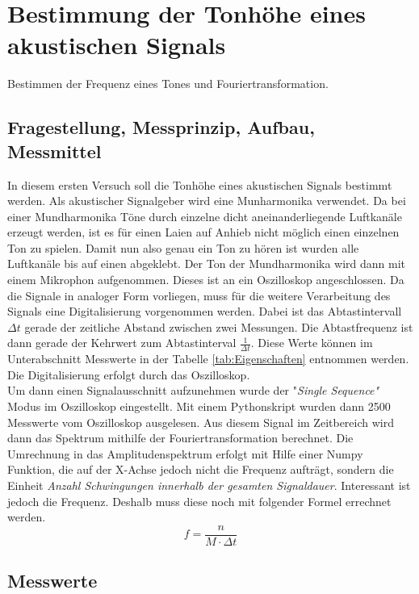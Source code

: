 %
%
\chapter{Bestimmung der Tonhöhe eines akustischen Signals}
\label{chap:VERSUCH_1}
Bestimmen der Frequenz eines Tones und Fouriertransformation.
 
\section{Fragestellung, Messprinzip, Aufbau, Messmittel}
\label{chap:VERSUCH_1_FRAGESTELLUNG}
In diesem ersten Versuch soll die Tonhöhe eines akustischen Signals bestimmt werden. Als akustischer Signalgeber wird eine Munharmonika verwendet. Da bei einer Mundharmonika Töne durch einzelne dicht aneinanderliegende Luftkanäle erzeugt werden, ist es für einen Laien auf Anhieb nicht möglich einen einzelnen Ton zu spielen. Damit nun also genau ein Ton zu hören ist wurden alle Luftkanäle bis auf einen abgeklebt.
Der Ton der Mundharmonika wird dann mit einem Mikrophon aufgenommen. Dieses ist an ein Oszilloskop angeschlossen. 
Da die Signale in analoger Form vorliegen, muss für die weitere Verarbeitung des Signals eine Digitalisierung vorgenommen werden.
Dabei ist das Abtastintervall $\Delta t$ gerade der zeitliche Abstand zwischen zwei Messungen. Die Abtastfrequenz ist dann gerade der Kehrwert zum Abtastinterval $\frac{1}{\Delta t}$. Diese Werte können im Unterabschnitt Messwerte in der Tabelle \ref{tab:Eigenschaften} entnommen werden. Die Digitalisierung erfolgt durch das Oszilloskop.
\\
Um dann einen Signalausschnitt aufzunehmen wurde der "\textit{Single Sequence"} Modus im Oszilloskop eingestellt. Mit einem Pythonskript wurden dann 2500 Messwerte vom Oszilloskop ausgelesen.
Aus diesem Signal im Zeitbereich wird dann das Spektrum mithilfe der Fouriertransformation berechnet. Die Umrechnung in das Amplitudenspektrum
erfolgt mit Hilfe einer Numpy Funktion, die auf der X-Achse jedoch nicht die Frequenz aufträgt, sondern die Einheit \textit{Anzahl Schwingungen innerhalb der gesamten Signaldauer}. Interessant ist jedoch die Frequenz. Deshalb muss diese noch mit folgender Formel errechnet werden.
\begin{equation}
f = \dfrac{n}{M \cdot \Delta t}
\end{equation}




\section{Messwerte}
\label{chap:VERSUCH_1_MESSWERTE}


